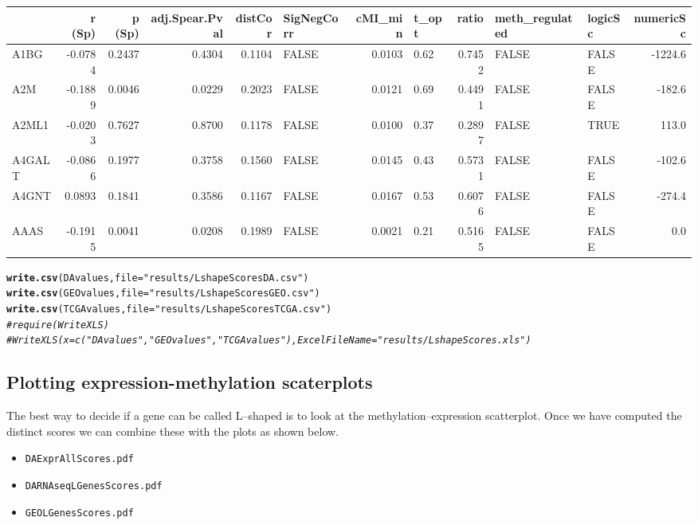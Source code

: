 \documentclass[a4paper,10pt]{article}\usepackage[]{graphicx}\usepackage[]{color}
\makeatletter
\newcommand{\hlstr}[1]{\textcolor[rgb]{0.192,0.494,0.8}{#1}}%
\newcommand{\hlcom}[1]{\textcolor[rgb]{0.678,0.584,0.686}{\textit{#1}}}%
\newcommand{\hlstd}[1]{\textcolor[rgb]{0.345,0.345,0.345}{#1}}%
\newcommand{\hlkwc}[1]{\textcolor[rgb]{0.333,0.667,0.333}{#1}}%
\newcommand{\hlkwd}[1]{\textcolor[rgb]{0.737,0.353,0.396}{\textbf{#1}}}%
\newenvironment{kframe}{%
 \def\at@end@of@kframe{}%
 \ifinner\ifhmode%
  \def\at@end@of@kframe{\end{minipage}}%
  \begin{minipage}{\columnwidth}%
 \fi\fi%
 \def\FrameCommand##1{\hskip\@totalleftmargin \hskip-\fboxsep
 \colorbox{shadecolor}{##1}\hskip-\fboxsep
     \hskip-\linewidth \hskip-\@totalleftmargin \hskip\columnwidth}%
 \MakeFramed {\advance\hsize-\width
   \@totalleftmargin\z@ \linewidth\hsize
   \@setminipage}}%
 {\par\unskip\endMakeFramed%
 \at@end@of@kframe}
\newenvironment{knitrout}{}{} %
\makeatother
\begin{document}
\begin{knitrout}
\begin{tabular}{l|r|r|r|r|l|r|l|r|l|l|r}
\hline
  & r (Sp) & p (Sp) & adj.Spear.Pval & distCor & SigNegCorr & cMI\_min & t\_opt & ratio & meth\_regulated & logicSc & numericSc\\
\hline
A1BG & -0.0784 & 0.2437 & 0.4304 & 0.1104 & FALSE & 0.0103 & 0.62 & 0.7452 & FALSE & FALSE & -1224.6\\
\hline
A2M & -0.1889 & 0.0046 & 0.0229 & 0.2023 & FALSE & 0.0121 & 0.69 & 0.4491 & FALSE & FALSE & -182.6\\
\hline
A2ML1 & -0.0203 & 0.7627 & 0.8700 & 0.1178 & FALSE & 0.0100 & 0.37 & 0.2897 & FALSE & TRUE & 113.0\\
\hline
A4GALT & -0.0866 & 0.1977 & 0.3758 & 0.1560 & FALSE & 0.0145 & 0.43 & 0.5731 & FALSE & FALSE & -102.6\\
\hline
A4GNT & 0.0893 & 0.1841 & 0.3586 & 0.1167 & FALSE & 0.0167 & 0.53 & 0.6076 & FALSE & FALSE & -274.4\\
\hline
AAAS & -0.1915 & 0.0041 & 0.0208 & 0.1989 & FALSE & 0.0021 & 0.21 & 0.5165 & FALSE & FALSE & 0.0\\
\hline
\end{tabular}\begin{kframe}\begin{alltt}
\hlkwd{write.csv}\hlstd{(DAvalues,} \hlkwc{file}\hlstd{=}\hlstr{"results/LshapeScoresDA.csv"}\hlstd{)}
\hlkwd{write.csv}\hlstd{(GEOvalues,} \hlkwc{file}\hlstd{=}\hlstr{"results/LshapeScoresGEO.csv"}\hlstd{)}
\hlkwd{write.csv}\hlstd{(TCGAvalues,} \hlkwc{file}\hlstd{=}\hlstr{"results/LshapeScoresTCGA.csv"}\hlstd{)}
\hlcom{# require(WriteXLS)}
\hlcom{# WriteXLS(x=c("DAvalues", "GEOvalues", "TCGAvalues"), ExcelFileName = "results/LshapeScores.xls")}
\end{alltt}
\end{kframe}
\end{knitrout}

\subsection{Plotting expression-methylation scaterplots}

The best way to decide if a gene can be called L--shaped is to look at the methylation--expression scatterplot.
Once we have computed the distinct scores we can combine these with the plots as shown below.

\begin{itemize}
  \item \texttt{DAExprAllScores.pdf}
  \item \texttt{DARNAseqLGenesScores.pdf}
  \item \texttt{GEOLGenesScores.pdf}
\end{itemize}
\end{document}
